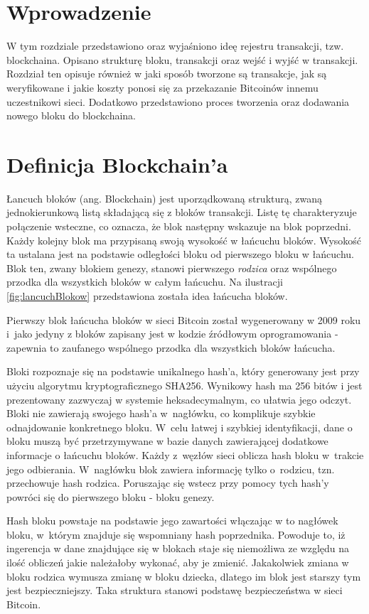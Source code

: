 \documentclass[12pt, twoside, final, openany]{mgr}
\begin{document}
\section{Wprowadzenie}
\indent W tym rozdziale przedstawiono oraz wyjaśniono ideę rejestru transakcji, tzw. blockchaina. Opisano strukturę bloku, transakcji oraz wejść i wyjść w transakcji. Rozdział ten opisuje również w jaki sposób tworzone są transakcje, jak są weryfikowane i jakie koszty ponosi się za przekazanie Bitcoinów innemu uczestnikowi sieci. Dodatkowo przedstawiono proces tworzenia oraz dodawania nowego bloku do blockchaina. 

\section{Definicja Blockchain'a}
\label{definicjaBlockchaina}
\indent Łancuch bloków (ang. Blockchain) jest uporządkowaną strukturą, zwaną jednokierunkową listą składającą się z bloków transakcji. Listę tę charakteryzuje połączenie wsteczne, co oznacza, że blok następny wskazuje na blok poprzedni. Każdy kolejny blok ma przypisaną swoją wysokość w łańcuchu bloków. Wysokość ta ustalana jest na podstawie odległości bloku od pierwszego bloku w łańcuchu. Blok ten, zwany blokiem genezy, stanowi pierwszego \textit{rodzica} oraz wspólnego przodka dla wszystkich bloków w całym łańcuchu\cite{BitcoinAndCryptocurrencyTechnologies}. Na ilustracji \ref{fig:lancuchBlokow} przedstawiona została idea łańcucha bloków.

\indent Pierwszy blok łańcucha bloków w sieci Bitcoin został wygenerowany w 2009 roku i~jako jedyny z bloków zapisany jest w kodzie źródłowym oprogramowania - zapewnia to zaufanego wspólnego przodka dla wszystkich bloków łańcucha.

\indent Bloki rozpoznaje się na podstawie unikalnego hash'a, który generowany jest przy użyciu algorytmu kryptograficznego SHA256. Wynikowy hash ma 256 bitów i jest prezentowany zazwyczaj w systemie heksadecymalnym, co ułatwia jego odczyt. Bloki nie zawierają swojego hash'a w~nagłówku, co komplikuje szybkie odnajdowanie konkretnego bloku. W~celu łatwej i szybkiej identyfikacji, dane o bloku muszą być przetrzymywane w bazie danych zawierającej dodatkowe informacje o łańcuchu bloków. Każdy z~węzłów sieci oblicza hash bloku w~trakcie jego odbierania. W~nagłówku blok zawiera informację tylko o~rodzicu, tzn. przechowuje hash rodzica. Poruszając się wstecz przy pomocy tych hash'y powróci się do pierwszego bloku - bloku genezy. 

\indent Hash bloku powstaje na podstawie jego zawartości włączając w to nagłówek bloku, w~którym znajduje się wspomniany hash poprzednika. Powoduje to, iż ingerencja w dane znajdujące się w blokach staje się niemożliwa ze względu na ilość obliczeń jakie należałoby wykonać, aby je zmienić. Jakakolwiek zmiana w bloku rodzica wymusza zmianę w bloku dziecka, dlatego im blok jest starszy tym jest bezpieczniejszy. Taka struktura stanowi podstawę bezpieczeństwa w sieci Bitcoin.
\end{document}

